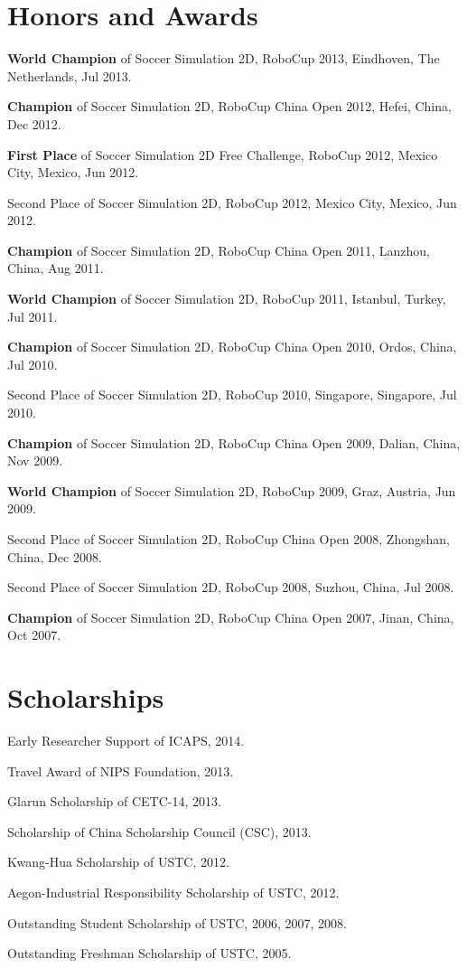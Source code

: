 \documentclass[letterpaper,10pt]{article}
\renewenvironment{itemize}{
  \begin{list}{}{
    \setlength{\leftmargin}{1.5em}
  }
}{
  \end{list}
}
\begin{document}
\section*{Honors and Awards}
\begin{itemize}
	\item \textbf{World Champion} of Soccer Simulation 2D, RoboCup 2013, Eindhoven, The Netherlands, Jul 2013.
	\item \textbf{Champion} of Soccer Simulation 2D, RoboCup China Open 2012, Hefei, China, Dec 2012.
	\item \textbf{First Place} of Soccer Simulation 2D Free Challenge, RoboCup 2012, Mexico City, Mexico, Jun 2012.
	\item Second Place of Soccer Simulation 2D, RoboCup 2012, Mexico City, Mexico, Jun 2012.
	\item \textbf{Champion} of Soccer Simulation 2D, RoboCup China Open 2011, Lanzhou, China, Aug 2011.
	\item \textbf{World Champion} of Soccer Simulation 2D, RoboCup 2011, Istanbul, Turkey, Jul 2011.
	\item \textbf{Champion} of Soccer Simulation 2D, RoboCup China Open 2010, Ordos, China, Jul 2010.
	\item Second Place of Soccer Simulation 2D, RoboCup 2010, Singapore, Singapore, Jul 2010.
	\item \textbf{Champion} of Soccer Simulation 2D, RoboCup China Open 2009, Dalian, China, Nov 2009.
	\item \textbf{World Champion} of Soccer Simulation 2D, RoboCup 2009, Graz, Austria, Jun 2009.
	\item Second Place of Soccer Simulation 2D, RoboCup China Open 2008, Zhongshan, China, Dec 2008.
	\item Second Place of Soccer Simulation 2D, RoboCup 2008, Suzhou, China, Jul 2008.
	\item \textbf{Champion} of Soccer Simulation 2D, RoboCup China Open 2007, Jinan, China, Oct 2007.
\end{itemize}

\vspace{10pt}
\section*{Scholarships}
\begin{itemize}
	\item Early Researcher Support of ICAPS, 2014.
	\item Travel Award of NIPS Foundation, 2013.
	\item Glarun Scholarship of CETC-14, 2013.
	\item Scholarship of China Scholarship Council (CSC), 2013.
	\item Kwang-Hua Scholarship of USTC, 2012.
	\item Aegon-Industrial Responsibility Scholarship of USTC, 2012.
	\item Outstanding Student Scholarship of USTC, 2006, 2007, 2008.
	\item Outstanding Freshman Scholarship of USTC, 2005.
\end{itemize}
\end{document}
